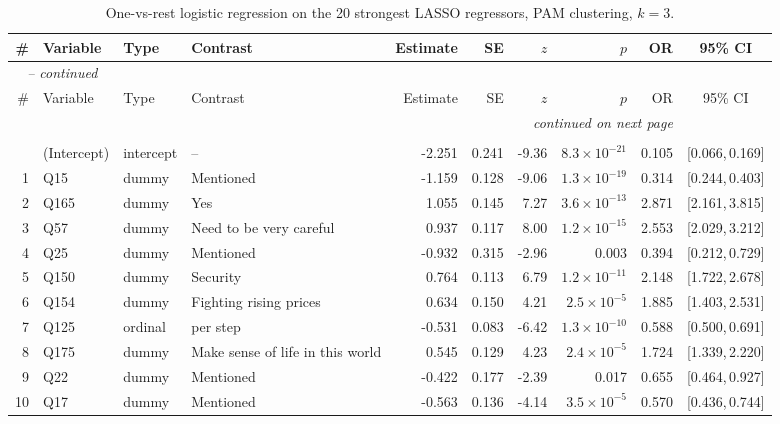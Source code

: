 \begin{landscape}
\begingroup\footnotesize
\begin{longtable}{r l l l r r r r r c}
\caption{One-vs-rest logistic regression on the 20 strongest LASSO regressors, PAM clustering, $k = 3$.}\label{tab:logit-PAM-k3}\\
\toprule
\# & Variable & Type & Contrast & Estimate & SE & $z$ & $p$ & OR & 95\% CI \\
\midrule
\endfirsthead
\multicolumn{9}{l}{\emph{\tablename\ \thetable{} -- continued}}\\
\toprule
\# & Variable & Type & Contrast & Estimate & SE & $z$ & $p$ & OR & 95\% CI \\
\midrule
\endhead
\midrule \multicolumn{9}{r}{\emph{continued on next page}}\\
\endfoot
\bottomrule
\endlastfoot
\multicolumn{9}{l}{\textbf{Cluster 1} \quad \small $n = 2579$ ($n_{\text{in}} = 814$), AIC $= 2348.6$, residual deviance $= 2306.6$ on 2558 df}\\[2pt]
 & (Intercept) & intercept & -- & -2.251 & 0.241 & -9.36 & $8.3{\times}10^{-21}$ & 0.105 & [0.066,\,0.169] &  \\
1 & Q15 & dummy & Mentioned & -1.159 & 0.128 & -9.06 & $1.3{\times}10^{-19}$ & 0.314 & [0.244,\,0.403] &  \\
2 & Q165 & dummy & Yes & 1.055 & 0.145 & 7.27 & $3.6{\times}10^{-13}$ & 2.871 & [2.161,\,3.815] &  \\
3 & Q57 & dummy & Need to be very careful & 0.937 & 0.117 & 8.00 & $1.2{\times}10^{-15}$ & 2.553 & [2.029,\,3.212] &  \\
4 & Q25 & dummy & Mentioned & -0.932 & 0.315 & -2.96 & 0.003 & 0.394 & [0.212,\,0.729] &  \\
5 & Q150 & dummy & Security & 0.764 & 0.113 & 6.79 & $1.2{\times}10^{-11}$ & 2.148 & [1.722,\,2.678] &  \\
6 & Q154 & dummy & Fighting rising prices & 0.634 & 0.150 & 4.21 & $2.5{\times}10^{-5}$ & 1.885 & [1.403,\,2.531] &  \\
7 & Q125 & ordinal & per step & -0.531 & 0.083 & -6.42 & $1.3{\times}10^{-10}$ & 0.588 & [0.500,\,0.691] &  \\
8 & Q175 & dummy & Make sense of life in this world & 0.545 & 0.129 & 4.23 & $2.4{\times}10^{-5}$ & 1.724 & [1.339,\,2.220] &  \\
9 & Q22 & dummy & Mentioned & -0.422 & 0.177 & -2.39 & 0.017 & 0.655 & [0.464,\,0.927] &  \\
10 & Q17 & dummy & Mentioned & -0.563 & 0.136 & -4.14 & $3.5{\times}10^{-5}$ & 0.570 & [0.436,\,0.744] &  \\

\end{longtable}
\end{landscape}
